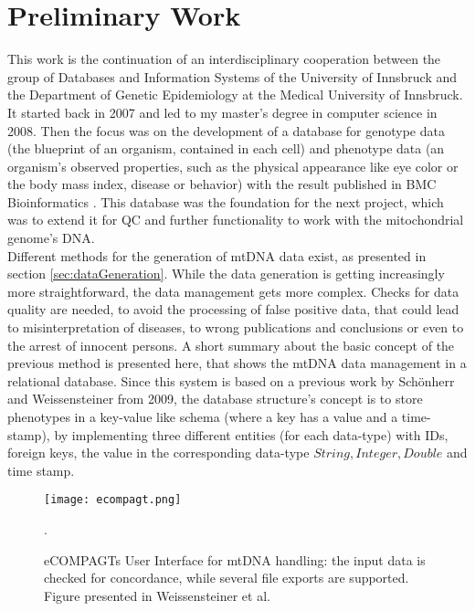 \section{Preliminary Work}
\label{prelimWork}
This work is the continuation of an interdisciplinary cooperation between the group of Databases and Information Systems of the University of Innsbruck and the Department of Genetic Epidemiology at the Medical University of Innsbruck. It started back in 2007 and led to my master's degree in computer science in 2008. Then the focus was on the development of a database for genotype data (the blueprint of an organism, contained in each cell) and phenotype data (an organism's observed properties, such as the physical appearance like eye color or the body mass index, disease or behavior) with the result published in BMC Bioinformatics \cite{Schoenherr2009}. This database was the foundation for the next project, which was to extend it for QC and further functionality to work with the mitochondrial genome's DNA. 
\\
Different methods for the generation of mtDNA data exist, as presented in section \ref{sec:dataGeneration}. While the data generation is getting increasingly more straightforward, the data management gets more complex. Checks for data quality are needed, to avoid the processing of false positive data, that could lead to misinterpretation of diseases, to wrong publications and conclusions or even to the arrest of innocent persons.
A short summary about the basic concept of the previous method is presented here, that shows the mtDNA data management in a relational database. Since this system is based on a previous work by Sch\"onherr and Weissensteiner \cite{Schoenherr2009} from 2009, the database structure's concept is to store phenotypes in a key-value like schema (where a key has a value and a time-stamp), by implementing three different entities (for each data-type)  with IDs, foreign keys, the value in the corresponding data-type $String, Integer, Double$ and time stamp.
\begin{figure}[ht]
\begin{center}
\texttt{[image: ecompagt.png]}
\caption[eCOMPAGTs User Interface]{eCOMPAGTs User Interface for mtDNA handling: the input data is checked for concordance, while several file exports are supported. Figure presented in Weissensteiner et al. \cite{Weissensteiner2010}}.
\label{fig:ecompagt}
\end{center}
\end{figure}

